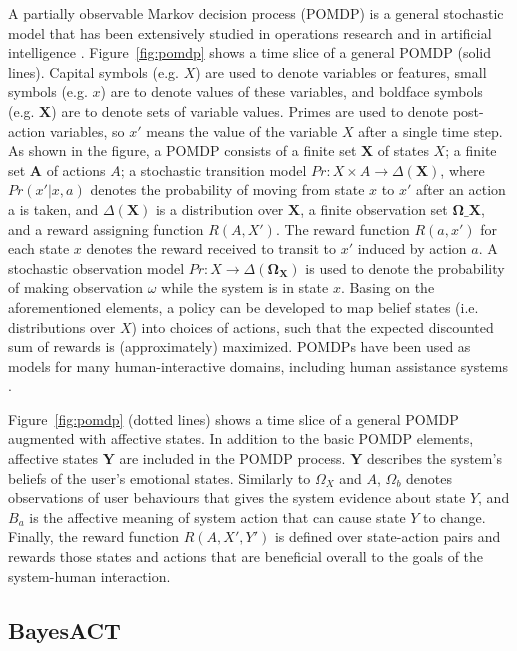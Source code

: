 A partially observable Markov decision process (POMDP) is a general stochastic model that has been extensively studied in operations research and in artificial intelligence \cite{monahan1982state, poupart2011introduction}. Figure~\ref{fig:pomdp} shows a time slice of a general POMDP (solid lines). Capital symbols (e.g. $X$) are used to denote variables or features, small symbols (e.g. $x$) are to denote values of these variables, and boldface symbols (e.g. $\mathbf{X}$) are to denote sets of variable values. Primes are used to denote post-action variables, so $x'$ means the value of the variable $X$ after a single time step. As shown in the figure, a POMDP consists of a finite set $\mathbf{X}$ of states $X$; a finite set $\mathbf{A}$ of actions $A$; a stochastic transition model $Pr : X \times A \to \Delta(\mathbf{X})$, where $Pr(x'|x, a)$ denotes the probability of moving from state $x$ to $x'$ after an action a is taken, and $\Delta(\mathbf{X})$ is a distribution over $\mathbf{X}$, a finite observation set $\mathbf{\Omega\_{X}}$, and a reward assigning function $R(A, X')$. The reward function $R(a, x')$ for each state $x$ denotes the reward received to transit to $x'$ induced by action $a$. A stochastic observation model $Pr : X \to \Delta(\mathbf{\Omega_{X}})$ is used to denote the probability of making observation $\omega$ while the system is in state $x$. Basing on the aforementioned elements, a policy can be developed to map belief states (i.e. distributions over $X$) into choices of actions, such that the expected discounted sum of rewards is (approximately) maximized. POMDPs have been used as models for many human-interactive domains, including human assistance systems \cite{hoey2010automated}.

Figure~\ref{fig:pomdp} (dotted lines) shows a time slice of a general POMDP augmented with affective states. In addition to the basic POMDP elements, affective states $\mathbf{Y}$ are included in the POMDP process. $\mathbf{Y}$ describes the system's beliefs of the user's emotional states. Similarly to $\Omega_{X}$ and $A$, $\Omega_{b}$ denotes observations of user behaviours that gives the system evidence about state $Y$, and $B_{a}$ is the affective meaning of system action that can cause state $Y$ to change. Finally, the reward function $R(A, X', Y')$ is defined over state-action pairs and rewards those states and actions that are beneficial overall to the goals of the system-human interaction. 

\subsection{BayesACT}

